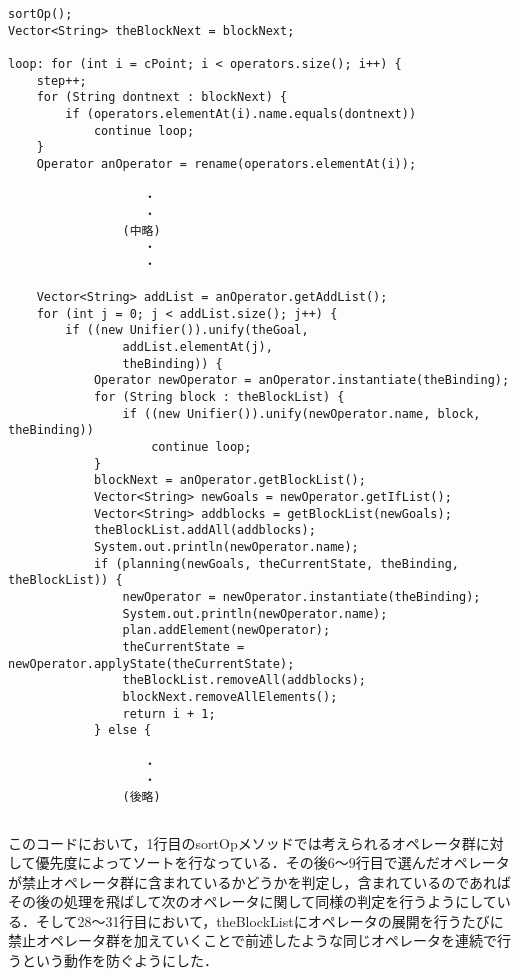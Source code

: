 \documentclass{jarticle}
\begin{document}
\begin{lstlisting}[caption=PlannerクラスのplanningAGoalメソッドより変更点を抜粋]
sortOp();
Vector<String> theBlockNext = blockNext;

loop: for (int i = cPoint; i < operators.size(); i++) {
	step++;
	for (String dontnext : blockNext) {
		if (operators.elementAt(i).name.equals(dontnext))
			continue loop;
	}
	Operator anOperator = rename(operators.elementAt(i));
	
				   ・
				   ・
				(中略)
				   ・
				   ・
				   
	Vector<String> addList = anOperator.getAddList();
	for (int j = 0; j < addList.size(); j++) {
		if ((new Unifier()).unify(theGoal,
				addList.elementAt(j),
				theBinding)) {
			Operator newOperator = anOperator.instantiate(theBinding);
			for (String block : theBlockList) {
				if ((new Unifier()).unify(newOperator.name, block, theBinding))
					continue loop;
			}
			blockNext = anOperator.getBlockList();
			Vector<String> newGoals = newOperator.getIfList();
			Vector<String> addblocks = getBlockList(newGoals);
			theBlockList.addAll(addblocks);
			System.out.println(newOperator.name);
			if (planning(newGoals, theCurrentState, theBinding, theBlockList)) {
				newOperator = newOperator.instantiate(theBinding);
				System.out.println(newOperator.name);
				plan.addElement(newOperator);
				theCurrentState = newOperator.applyState(theCurrentState);
				theBlockList.removeAll(addblocks);
				blockNext.removeAllElements();
				return i + 1;
			} else {
			
				   ・
				   ・
				(後略)

\end{lstlisting}
\begin{verbatim}

\end{verbatim}
このコードにおいて，1行目のsortOpメソッドでは考えられるオペレータ群に対して優先度によってソートを行なっている．その後6〜9行目で選んだオペレータが禁止オペレータ群に含まれているかどうかを判定し，含まれているのであればその後の処理を飛ばして次のオペレータに関して同様の判定を行うようにしている．そして28〜31行目において，theBlockListにオペレータの展開を行うたびに禁止オペレータ群を加えていくことで前述したような同じオペレータを連続で行うという動作を防ぐようにした．
\end{document}
